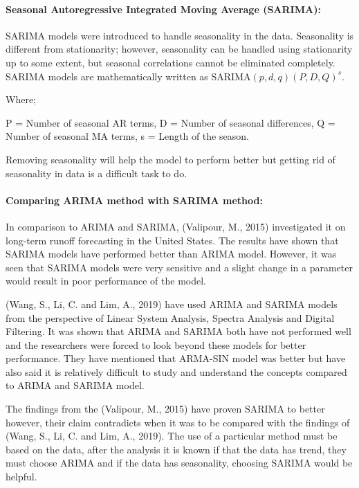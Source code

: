 \documentclass[
  letterpaper,
  DIV=11,
  numbers=noendperiod]{scrartcl}
\let\oldparagraph\paragraph
\renewcommand{\paragraph}[1]{\oldparagraph{#1}\mbox{}}
\begin{document}
\hypertarget{seasonal-autoregressive-integrated-moving-average-sarima}{%
\paragraph{\texorpdfstring{\textbf{Seasonal Autoregressive Integrated
Moving Average
(SARIMA):}}{Seasonal Autoregressive Integrated Moving Average (SARIMA):}}\label{seasonal-autoregressive-integrated-moving-average-sarima}}

SARIMA models were introduced to handle seasonality in the data.
Seasonality is different from stationarity; however, seasonality can be
handled using stationarity up to some extent, but seasonal correlations
cannot be eliminated completely. SARIMA models are mathematically
written as SARIMA\((p,d,q)(P,D,Q)^{s}\).

Where;

P = Number of seasonal AR terms, D = Number of seasonal differences, Q =
Number of seasonal MA terms, s = Length of the season.

Removing seasonality will help the model to perform better but getting
rid of seasonality in data is a difficult task to do.

\hypertarget{comparing-arima-method-with-sarima-method}{%
\paragraph{\texorpdfstring{\textbf{Comparing ARIMA method with SARIMA
method:}}{Comparing ARIMA method with SARIMA method:}}\label{comparing-arima-method-with-sarima-method}}

In comparison to ARIMA and SARIMA, (Valipour, M., 2015) investigated it
on long-term runoff forecasting in the United States. The results have
shown that SARIMA models have performed better than ARIMA model.
However, it was seen that SARIMA models were very sensitive and a slight
change in a parameter would result in poor performance of the model.

(Wang, S., Li, C. and Lim, A., 2019) have used ARIMA and SARIMA models
from the perspective of Linear System Analysis, Spectra Analysis and
Digital Filtering. It was shown that ARIMA and SARIMA both have not
performed well and the researchers were forced to look beyond these
models for better performance. They have mentioned that ARMA-SIN model
was better but have also said it is relatively difficult to study and
understand the concepts compared to ARIMA and SARIMA model.

The findings from the (Valipour, M., 2015) have proven SARIMA to better
however, their claim contradicts when it was to be compared with the
findings of (Wang, S., Li, C. and Lim, A., 2019). The use of a
particular method must be based on the data, after the analysis it is
known if that the data has trend, they must choose ARIMA and if the data
has seasonality, choosing SARIMA would be helpful.
\end{document}
